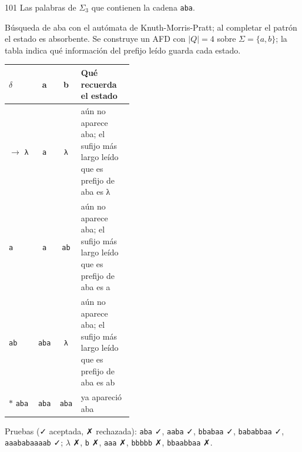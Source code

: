 \documentclass[11pt]{article}
\begin{document}
\begin{ejercicio}{101}{}
Las palabras de $\Sigma_3$ que contienen la cadena \texttt{aba}.
\end{ejercicio}
\proc Búsqueda de aba con el autómata de Knuth-Morris-Pratt; al completar el patrón el estado es absorbente. Se construye un AFD con $|Q| = 4$ sobre $\Sigma = \{a, b\}$; la tabla indica qué información del prefijo leído guarda cada estado.
\begin{center}\small\begin{tabular}{lccp{0.42\linewidth}}\toprule
$\delta$ & a & b & Qué recuerda el estado \\\midrule
$\to$ \texttt{λ} & \texttt{a} & \texttt{λ} & aún no aparece aba; el sufijo más largo leído que es prefijo de aba es λ \\
 \texttt{a} & \texttt{a} & \texttt{ab} & aún no aparece aba; el sufijo más largo leído que es prefijo de aba es a \\
 \texttt{ab} & \texttt{aba} & \texttt{λ} & aún no aparece aba; el sufijo más largo leído que es prefijo de aba es ab \\
$*$ \texttt{aba} & \texttt{aba} & \texttt{aba} & ya apareció aba \\
\bottomrule\end{tabular}\end{center}
Pruebas (✓ aceptada, ✗ rechazada): \texttt{aba} ✓, \texttt{aaba} ✓, \texttt{bbabaa} ✓, \texttt{bababbaa} ✓, \texttt{aaababaaaab} ✓; $\lambda$ ✗, \texttt{b} ✗, \texttt{aaa} ✗, \texttt{bbbbb} ✗, \texttt{bbaabbaa} ✗.
\end{document}
